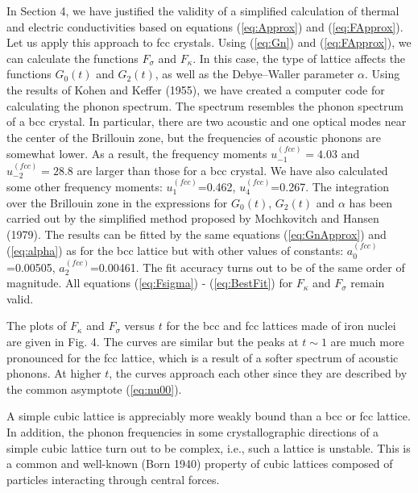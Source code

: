 In Section 4, we have justified the validity of a simplified
calculation of thermal and electric conductivities based on
equations (\ref{eq:Approx}) and (\ref{eq:FApprox}).
Let us apply this approach to fcc crystals.
Using (\ref{eq:Gn}) and (\ref{eq:FApprox}), we can calculate the functions
$F_\sigma$ and $F_\kappa$. In this case, the type of lattice affects the
functions $G_0(t)$ and $G_2(t)$, as well as the Debye--Waller parameter
$\alpha$. Using the results of Kohen and Keffer (1955), we
have created a computer code for calculating the phonon spectrum. The
spectrum resembles the phonon spectrum of a bcc
crystal. In particular, there are two acoustic and 
one optical modes near the center of the Brillouin zone, 
but the frequencies of acoustic phonons are somewhat lower. 
As a result, the frequency moments $u_{-1}^{(fcc)}=4.03$
and $u_{-2}^{(fcc)}=28.8$ are larger than those for a bcc crystal. 
We have also calculated some other frequency moments: 
$u_1^{(fcc)}$=0.462, $u_4^{(fcc)}$=0.267. The integration
over the Brillouin zone in the expressions for $G_0(t)$, $G_2(t)$ 
and $\alpha$ has been carried out by the simplified method proposed by
Mochkovitch and Hansen (1979). The results can be fitted by the same
equations (\ref{eq:GnApprox}) and (\ref{eq:alpha}) as for the
bcc lattice but with other values of constants: 
$a_0^{(fcc)}$=0.00505, $a_2^{(fcc)}$=0.00461. The fit accuracy
turns out to be of the same order of magnitude.
All equations (\ref{eq:Fsigma}) - (\ref{eq:BestFit}) 
for $F_\kappa$  and $F_\sigma$ remain valid.

The plots of $F_\kappa$ and $F_\sigma$ versus $t$ for the bcc and fcc
lattices made of iron nuclei are given in Fig. 4. The curves are
similar but the peaks at $t \sim 1$ are much more pronounced for the
fcc lattice, which is a result of a softer spectrum of acoustic phonons. 
At higher $t$, the curves approach each other
since they are described by the common asymptote (\ref{eq:nu00}).

A simple cubic lattice is appreciably more weakly bound than a
bcc or fcc lattice. In addition, the phonon frequencies in some
crystallographic directions of a simple cubic lattice turn out to
be complex, i.e., such a lattice is unstable. This is a common and
well-known (Born 1940) property of cubic lattices composed of
particles interacting through central forces.

